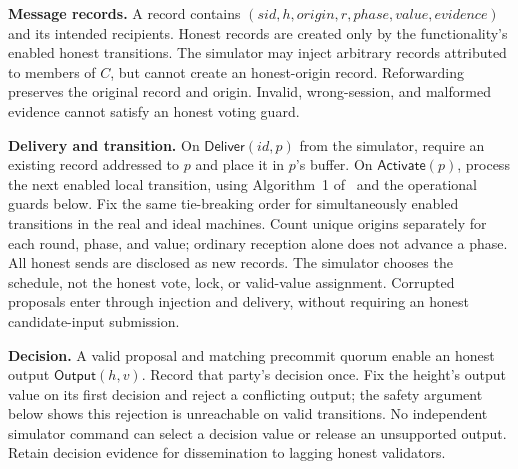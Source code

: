 \documentclass[conference,letterpaper,10pt]{IEEEtran}
\begin{document}
\begin{myframebox}[title={ $\mathcal{F}_{\scriptscriptstyle\mathsf{Tendermint}}$: voting and decision}]
\textbf{Message records.} A record contains $(sid,h,origin,r,phase,value,evidence)$ and its intended recipients. Honest records are created only by the functionality's enabled honest transitions. The simulator may inject arbitrary records attributed to members of $C$, but cannot create an honest-origin record. Reforwarding preserves the original record and origin. Invalid, wrong-session, and malformed evidence cannot satisfy an honest voting guard.

\textbf{Delivery and transition.} On $\mathsf{Deliver}(id,p)$ from the simulator, require an existing record addressed to $p$ and place it in $p$'s buffer. On $\mathsf{Activate}(p)$, process the next enabled local transition, using Algorithm~1 of~\cite{buchman2018latest} and the operational guards below. Fix the same tie-breaking order for simultaneously enabled transitions in the real and ideal machines. Count unique origins separately for each round, phase, and value; ordinary reception alone does not advance a phase. All honest sends are disclosed as new records. The simulator chooses the schedule, not the honest vote, lock, or valid-value assignment. Corrupted proposals enter through injection and delivery, without requiring an honest candidate-input submission.

\textbf{Decision.} A valid proposal and matching precommit quorum enable an honest output $\mathsf{Output}(h,v)$. Record that party's decision once. Fix the height's output value on its first decision and reject a conflicting output; the safety argument below shows this rejection is unreachable on valid transitions. No independent simulator command can select a decision value or release an unsupported output. Retain decision evidence for dissemination to lagging honest validators.
\end{myframebox}
\end{document}
